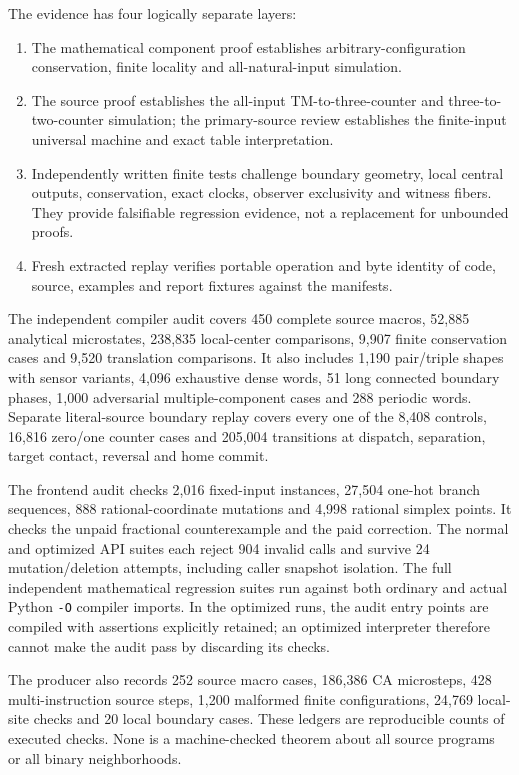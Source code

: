 \documentclass[11pt,a4paper]{article}
\numberwithin{equation}{section}
\begin{document}
The evidence has four logically separate layers:
\begin{enumerate}
\item The mathematical component proof establishes arbitrary-configuration
conservation, finite locality and all-natural-input simulation.
\item The source proof establishes the all-input TM-to-three-counter and
three-to-two-counter simulation; the primary-source review establishes the
finite-input universal machine and exact table interpretation.
\item Independently written finite tests challenge boundary geometry, local
central outputs, conservation, exact clocks, observer exclusivity and witness
fibers. They provide falsifiable regression evidence, not a replacement for
unbounded proofs.
\item Fresh extracted replay verifies portable operation and byte identity of
code, source, examples and report fixtures against the manifests.
\end{enumerate}

The independent compiler audit covers 450 complete source macros, 52,885
analytical microstates, 238,835 local-center comparisons, 9,907 finite
conservation cases and 9,520 translation comparisons. It also includes 1,190
pair/triple shapes with sensor variants, 4,096 exhaustive dense words, 51 long
connected boundary phases, 1,000 adversarial multiple-component cases and
288 periodic words. Separate literal-source boundary replay covers every one
of the 8,408 controls, 16,816 zero/one counter cases and 205,004 transitions
at dispatch, separation, target contact, reversal and home commit.

The frontend audit checks 2,016 fixed-input instances, 27,504 one-hot branch
sequences, 888 rational-coordinate mutations and 4,998 rational simplex points.
It checks the unpaid fractional counterexample and the paid correction.
The normal and optimized API suites each reject 904 invalid calls and survive
24 mutation/deletion attempts, including caller snapshot isolation. The full
independent mathematical regression suites run against both ordinary and
actual Python \texttt{-O} compiler imports. In the optimized runs, the audit
entry points are compiled with assertions explicitly retained; an optimized
interpreter therefore cannot make the audit pass by discarding its checks.

The producer also records 252 source macro cases, 186,386 CA microsteps,
428 multi-instruction source steps, 1,200 malformed finite configurations,
24,769 local-site checks and 20 local boundary cases. These ledgers are
reproducible counts of executed checks. None is a machine-checked theorem
about all source programs or all binary neighborhoods.
\end{document}
